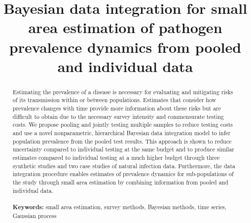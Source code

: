 \documentclass{article}
\title{Bayesian data integration for small area estimation of pathogen prevalence dynamics from pooled and individual data}
\begin{document}
\maketitle


\begin{abstract}
Estimating the prevalence of a disease is necessary for evaluating and mitigating risks of its transmission within or between populations. Estimates that consider how prevalence changes with time provide more information about these risks but are difficult to obtain due to the necessary survey intensity and commensurate testing costs. We propose pooling and jointly testing multiple samples to reduce testing costs and use a novel nonparametric, hierarchical Bayesian data integration model to infer population prevalence from the pooled test results. This approach is shown to reduce uncertainty compared to individual testing at the same budget and to produce similar estimates compared to individual testing at a much higher budget through three synthetic studies and two case studies of natural infection data. Furthermore, the data integration procedure enables estimates of prevalence dynamics for sub-populations of the study through small area estimation by combining information from pooled and individual data.\\
\\
{\bf Keywords:} small area estimation, survey methods, Bayesian methods, time series, Gaussian process
\end{abstract}


\end{document}
